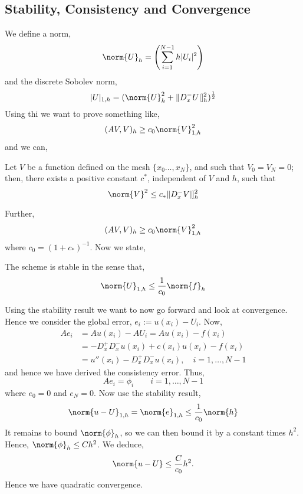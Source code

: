\subsection{Stability, Consistency and Convergence}
We define a norm,
$$ \norm{U}_h = \left( \sum_{i=1}^{N-1} h|U_i|^2 \right) $$
and the discrete Sobolev norm,
$$ |U|_{1, h} = (\norm{U}_h^2 + \|D_x^- U|]_h^2)^\frac{1}{2} $$
Using thi we want to prove something like,
$$ (AV, V)_h \ge c_0\norm{V}_{1, h}^2 $$
and we can,
\begin{nlemma}
  Let $V$ be a function defined on the mesh $\{x_0 \dots, x_N\}$, and such that $V_0 = V_N = 0$; then, there exists a positive constant $c^*$, independent of $V$ and $h$, such that
  $$ \norm{V}^2 \le c_* \| D_x^-V |]^2_h $$
\end{nlemma}
Further,
$$ (AV, V)_h \ge c_0 \norm{V}_{1, h}^2 $$
where $c_0 = (1 + c_*)^{-1}$. Now we state,
\begin{nthm}
  The scheme is stable in the sense that,
  $$ \norm{U}_{1, h} \le \frac{1}{c_0}\norm{f}_h $$
\end{nthm}
Using the stability result we want to now go forward and look at convergence. Hence we consider the global error, $e_i := u(x_i) - U_i$. Now,
\begin{align*}
  Ae_i &= Au(x_i) - AU_i = Au(x_i) - f(x_i) \\
  &= -D_x^+D_x^-u(x_i) + c(x_i)u(x_i)- f(x_i) \\
  &= u''(x_i) - D_x^+D_x^- u(x_i), \quad i = 1, \dots, N-1
\end{align*}
and hence we have derived the consistency error. Thus,
$$ Ae_i = \phi_i \qquad i = 1, \dots, N-1 $$
where $e_0 = 0$ and $e_N = 0$. Now use the stability result,
\begin{align*}
  \norm{u - U}_{1, h} = \norm{e}_{1, h} \le \frac{1}{c_0}\norm{h}
\end{align*}
It remains to bound $\norm{\phi}_h$, so we can then bound it by a constant times $h^2$. Hence, $\norm{\phi}_h \le Ch^2$. We deduce,
$$ \norm{u - U} \le \frac{C}{c_0}h^2. $$
Hence we have quadratic convergence.